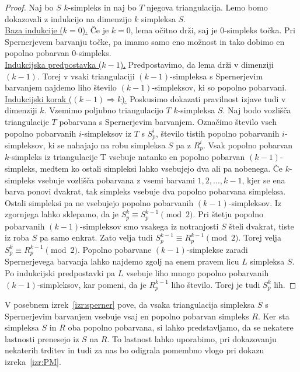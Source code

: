 \documentclass[mat1]{fmfdelo}
\newcommand{\0}{\underline{0}}
\begin{document}
\begin{proof}
Naj bo $S$ $k$-simpleks in naj bo $T$ njegova triangulacija. Lemo bomo dokazovali z indukcijo na dimenzijo $k$ simpleksa $S$. \\
\underline{Baza indukcije ($k = 0$).}
Če je $k=0$, lema očitno drži, saj je $0$-simpleks točka. Pri Spernerjevem barvanju točke, pa imamo samo eno možnost in tako dobimo en popolno pobarvan $0$-simpleks.\\
\underline{Indukcijska predpostavka ($k - 1$).}
Predpostavimo, da lema drži v dimenziji $(k - 1)$. Torej v vsaki triangulaciji $(k - 1)$-simpleksa s Spernerjevim barvanjem najdemo liho število $(k - 1)$-simpleksov, ki so popolno pobarvani. \\
\underline{Indukcijski korak ($(k - 1) \Longrightarrow k$).}
Poskusimo dokazati pravilnost izjave tudi v dimenziji $k$. Vzemimo poljubno triangulacijo $T$ $k$-simpleksa $S$. Naj bodo vozlišča triangulacije $T$ pobarvana s Spernerjevim barvanjem. Označimo število vseh popolno pobarvanih $i$-simpleksov iz $T$ s $S_p^i$, število tistih popolno pobarvanih $i$-simpleksov, ki se nahajajo na robu simpleksa $S$ pa z $R_p^i$. Vsak popolno pobarvan $k$-simpleks iz triangulacije T vsebuje natanko en popolno pobarvan $(k-1)$-simpleks, medtem ko ostali simpleksi lahko vsebujejo dva ali pa nobenega. Če $k$-simpleks vsebuje vozlišča pobarvana z vsemi barvami $1, 2, \dots, k-1$, kjer se ena barva ponovi dvakrat, tak simpleks vsebuje dva popolno pobarvana simpleksa. Ostali simpleksi pa ne vsebujejo popolno pobarvanih $(k - 1)$-simpleksov. Iz zgornjega lahko sklepamo, da je $S_p^k \equiv S_p^{k-1} \pmod 2$. Pri štetju popolno pobarvanih $(k - 1)$-simpleksov smo vsakega iz notranjosti $S$ šteli dvakrat, tiste iz roba $S$ pa samo enkrat. Zato velja tudi $S_p^{k-1} \equiv R_p^{k - 1} \pmod 2$. Torej velja $S_p^k \equiv R_p^{k - 1} \pmod 2$. Popolno pobarvane $(k - 1)$-simplekse zaradi Spernerjevega barvanja lahko najdemo zgolj na enem pravem licu $L$ simpleksa $S$. Po indukcijski predpostavki pa $L$ vsebuje liho mnogo popolno pobarvanih $(k - 1)$-simpleksov, kar pomeni, da je $R_p^{k - 1}$ liho število. Torej je tudi  $S_p^k$ lih.
\end{proof}
V posebnem izrek~\ref{izr:sperner} pove, da vsaka triangulacija simpleksa $S$ s Spernerjevim barvanjem vsebuje vsaj en popolno pobarvan simpleks $R$. Ker sta simpleksa $S$ in $R$ oba popolno pobarvana, si lahko predstavljamo, da se nekatere lastnosti prenesejo iz $S$ na $R$. To lastnost lahko uporabimo, pri dokazovanju nekaterih trditev in tudi za nas bo odigrala pomembno vlogo pri dokazu izreka~\ref{izr:PM}. 
\end{document}
